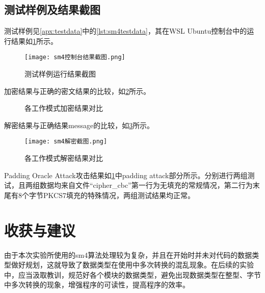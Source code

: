 \documentclass[a4paper, zihao=-4, UTF-8]{ctexart}
\begin{document}
			\subsection{测试样例及结果截图}
			测试样例见\cref{apx:testdata}中的\cref{lst:sm4testdata}，其在WSL Ubuntu控制台中的运行结果如\cref{fig:sm4_console_res}所示。
			
			\begin{figure}[htbp]
				\centering
				\texttt{[image: sm4控制台结果截图.png]}
				\caption{测试样例运行结果截图}
				\label{fig:sm4_console_res}
			\end{figure}

			加密结果与正确的密文结果的比较，如\cref{fig:sm4_encrypt}所示。

			\begin{figure}[htbp]
				\centering
				\caption{各工作模式加密结果对比}
				\label{fig:sm4_encrypt}
			\end{figure}

			解密结果与正确结果message的比较，如\cref{fig:sm4_decrypt}所示。

			\begin{figure}[htbp]
				\centering
				\texttt{[image: sm4解密截图.png]}
				\caption{各工作模式解密结果对比}
				\label{fig:sm4_decrypt}
			\end{figure}

			Padding Oracle Attack攻击结果如\cref{fig:sm4_console_res}中padding attack部分所示。分别进行两组测试，且两组数据均来自文件“cipher\_cbc”第一行为无填充的常规情况，第二行为末尾有8个字节PKCS7填充的特殊情况，两组测试结果均正常。
			
		\section{收获与建议}
			由于本次实验所使用的sm4算法处理较为复杂，并且在开始时并未对代码的数据类型做好规划，这就导致了数据类型在使用中多次转换的混乱现象。在后续的实验中，应当汲取教训，规范好各个模块的数据类型，避免出现数据类型在整型、字节中多次转换的现象，增强程序的可读性，提高程序的效率。
\end{document}
